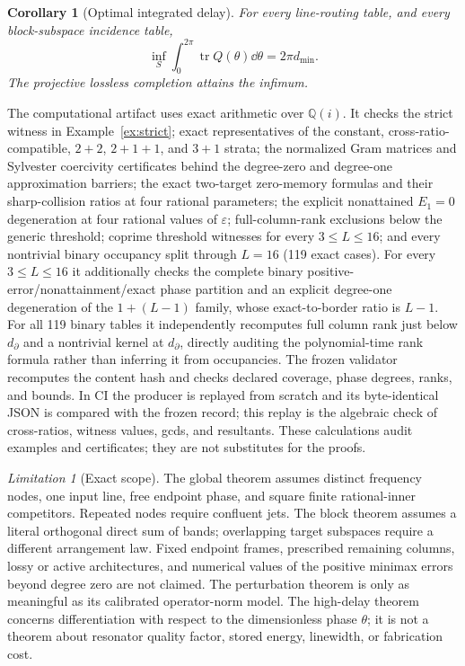 \documentclass[11pt]{article}
\newtheorem{corollary}[theorem]{Corollary}
\theoremstyle{definition}\newtheorem{definition}[theorem]{Definition}\newtheorem{example}[theorem]{Example}
\theoremstyle{remark}\newtheorem{remark}[theorem]{Remark}\newtheorem{limitation}[theorem]{Limitation}
\begin{document}
\begin{corollary}[Optimal integrated delay]\label{cor:delay}
For every line-routing table, and every block-subspace incidence table,
\[
 \inf_S\int_0^{2\pi}\operatorname{tr}Q(\theta)\dd\theta=2\pi d_{\min}.
\]
The projective lossless completion attains the infimum.
\end{corollary}

The computational artifact uses exact arithmetic over $\mathbb Q(i)$.  It
checks the strict witness in Example~\ref{ex:strict}; exact representatives of the
constant, cross-ratio-compatible, $2+2$, $2+1+1$, and $3+1$ strata;
the normalized Gram matrices and Sylvester coercivity certificates behind the
degree-zero and degree-one approximation barriers; the exact two-target
zero-memory formulas and their sharp-collision ratios at four rational
parameters;
the explicit nonattained $E_1=0$ degeneration at four rational values of
$\varepsilon$;
full-column-rank exclusions below the
generic threshold; coprime threshold witnesses for every $3\le L\le16$; and
every nontrivial binary occupancy split through $L=16$ (119 exact cases).
For every $3\le L\le16$ it additionally checks the complete binary
positive-error/nonattainment/exact phase partition and an explicit degree-one
degeneration of the $1+(L-1)$ family, whose exact-to-border ratio is $L-1$.
For all 119 binary tables it independently recomputes full column rank just
below $d_\partial$ and a nontrivial kernel at $d_\partial$, directly auditing
the polynomial-time rank formula rather than inferring it from occupancies.
The frozen validator recomputes the content hash and checks declared coverage,
phase degrees, ranks, and bounds.  In CI the producer is replayed from scratch
and its byte-identical JSON is compared with the frozen record; this replay is
the algebraic check of cross-ratios, witness values, gcds, and resultants.
These calculations
audit examples and certificates; they are not substitutes for the proofs.

\begin{limitation}[Exact scope]
The global theorem assumes distinct frequency nodes, one input line, free
endpoint phase, and square finite rational-inner competitors.  Repeated nodes
require confluent jets.  The block theorem assumes a literal orthogonal direct
sum of bands; overlapping target subspaces require a different arrangement
law.  Fixed endpoint frames, prescribed remaining columns, lossy or active
architectures, and numerical values of the positive minimax errors beyond
degree zero are not claimed.  The perturbation theorem is only as meaningful
as its calibrated operator-norm model.  The high-delay theorem concerns
differentiation with respect to the dimensionless phase $\theta$; it is not a
theorem about resonator quality factor, stored energy, linewidth, or
fabrication cost.
\end{limitation}
\end{document}
